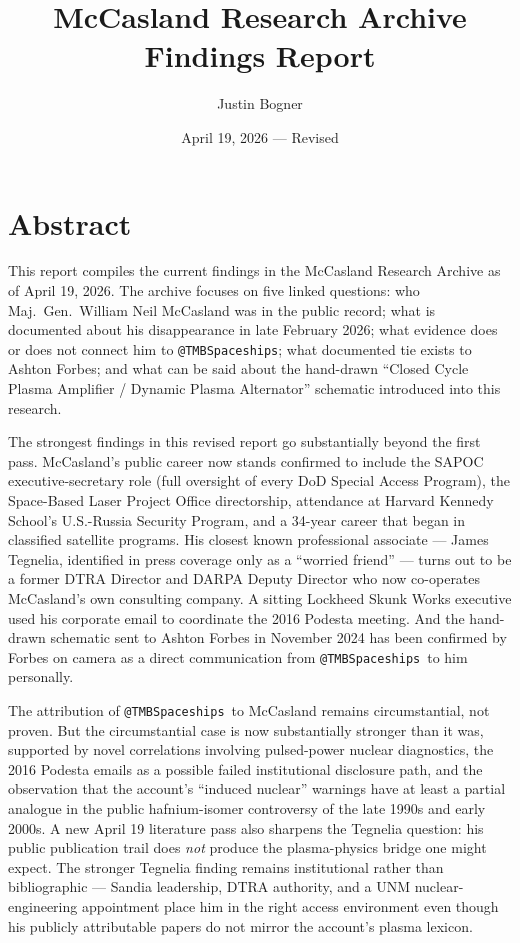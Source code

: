 \documentclass[11pt]{article}
\title{McCasland Research Archive\\Findings Report}
\author{Justin Bogner}
\date{April 19, 2026 --- Revised}
\makeatletter
\newcommand{\account}{\texttt{@TMBSpaceships}}
\makeatother
\begin{document}
\maketitle
\tableofcontents
\newpage

\section{Abstract}

This report compiles the current findings in the McCasland Research Archive as of April 19, 2026. The archive focuses on five linked questions: who Maj.\ Gen.\ William Neil McCasland was in the public record; what is documented about his disappearance in late February 2026; what evidence does or does not connect him to \account; what documented tie exists to Ashton Forbes; and what can be said about the hand-drawn ``Closed Cycle Plasma Amplifier / Dynamic Plasma Alternator'' schematic introduced into this research.

The strongest findings in this revised report go substantially beyond the first pass. McCasland's public career now stands confirmed to include the SAPOC executive-secretary role (full oversight of every DoD Special Access Program), the Space-Based Laser Project Office directorship, attendance at Harvard Kennedy School's U.S.-Russia Security Program, and a 34-year career that began in classified satellite programs. His closest known professional associate — James Tegnelia, identified in press coverage only as a ``worried friend'' — turns out to be a former DTRA Director and DARPA Deputy Director who now co-operates McCasland's own consulting company. A sitting Lockheed Skunk Works executive used his corporate email to coordinate the 2016 Podesta meeting. And the hand-drawn schematic sent to Ashton Forbes in November 2024 has been confirmed by Forbes on camera as a direct communication from \account\ to him personally.

The attribution of \account\ to McCasland remains circumstantial, not proven. But the circumstantial case is now substantially stronger than it was, supported by novel correlations involving pulsed-power nuclear diagnostics, the 2016 Podesta emails as a possible failed institutional disclosure path, and the observation that the account's ``induced nuclear'' warnings have at least a partial analogue in the public hafnium-isomer controversy of the late 1990s and early 2000s. A new April 19 literature pass also sharpens the Tegnelia question: his public publication trail does \emph{not} produce the plasma-physics bridge one might expect. The stronger Tegnelia finding remains institutional rather than bibliographic --- Sandia leadership, DTRA authority, and a UNM nuclear-engineering appointment place him in the right access environment even though his publicly attributable papers do not mirror the account's plasma lexicon.
\end{document}
